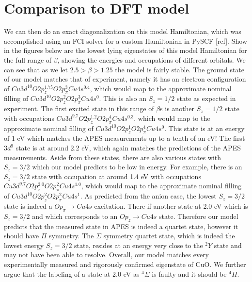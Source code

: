 \documentclass{article}
\begin{document}
\section{Comparison to DFT model}
We can then do an exact diagonalization on this model Hamiltonian, which was accomplished using an FCI solver for a custom Hamiltonian in PySCF [ref]. Show in the figures below are the lowest lying eigenstates of this model Hamiltonian for the full range of $\beta$, showing the energies and occupations of different orbitals. We can see that as we let $2.5 > \beta > 1.25 $ the model is fairly stable. The ground state of our model matches that of experiment, namely it has an electron configuration of $Cu 3d^{10} O 2p_z^{1.75} O 2p_\pi^3 Cu 4s^{0.4}$, which would map to the approximate nominal filling of $Cu 3d^{10} O 2p_z^{2} O 2p_\pi^3 Cu 4s^{0}.$ This is also an $S_z=1/2$ state as expected in experiment. The first excited state in this range of $\beta$s is another $S_z=1/2$ state with occupations $Cu 3d^{9.7} O 2p_z^{1.2} O 2p_\pi^4 Cu 4s^{0.3}$, which would map to the approximate nominal filling of $Cu 3d^{10} O 2p_z^{1} O 2p_\pi^4 Cu 4s^{0}.$ This state is at an energy of 1 eV which matches the APES measurements up to a tenth of an eV! The first $3d^9$ state is at around 2.2 eV, which again matches the predictions of the APES measurements. Aside from these states, there are also various states with $S_z=3/2$ which our model predicts to be low in energy. For example, there is an $S_z=3/2$ state with occupation at around 1.4 eV with occupations $Cu 3d^{9.7} O 2p_z^{2.0} O 2p_\pi^2 Cu 4s^{1.0}$, which would map to the approximate nominal filling of $Cu 3d^{10} O 2p_z^{2} O 2p_\pi^2 Cu 4s^{1}.$ As predicted from the anion case, the lowest $S_z=3/2$ state is indeed a $O p_\pi \rightarrow Cu 4s$ excitation. There if another state at 2.0 eV which is $S_z =3/2$ and which corresponds to an $O p_z \rightarrow Cu 4s$ state. Therefore our model predicts that the measured state in APES is indeed a quartet state, however it should have $\Pi$ symmetry. The $\Sigma$ symmetry quartet state, which is indeed the lowest energy $S_z=3/2$ state, resides at an energy very close to the $^2Y$ state and may not have been able to resolve. Overall, our model matches every experimentally measured and rigorously confirmed eigenstate of CuO. We further argue that the labeling of a state at 2.0 eV as $^4\Sigma$ is faulty and it should be $^4\Pi$.
\end{document}
